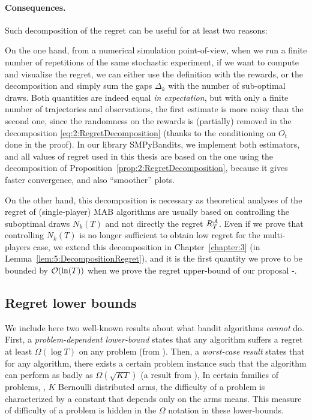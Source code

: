 \paragraph{Consequences.}
%
Such decomposition of the regret can be useful for at least two reasons:

On the one hand, from a numerical simulation point-of-view, when we run a finite number of repetitions of the same stochastic experiment, if we want to compute and visualize the regret, we can either use the definition with the rewards, or the decomposition and simply sum the gaps $\Delta_k$ with the number of sub-optimal draws.
Both quantities are indeed equal \emph{in expectation}, but with only a finite number of trajectories and observations, the first estimate is more noisy than the second one, since the randomness on the rewards is (partially) removed in the decomposition \eqref{eq:2:RegretDecomposition} (thanks to the conditioning on $O_t$ done in the proof).
In our library SMPyBandits, we implement both estimators, and all values of regret used in this thesis are based on the one using the decomposition of Proposition~\ref{prop:2:RegretDecomposition}, because it gives faster convergence, and also ``smoother'' plots.
\label{remark:2:moreAccurateCountofRegretForSimulations}

On the other hand, this decomposition is necessary as theoretical analyses of the regret of (single-player) MAB algorithms are usually based on controlling the suboptimal draws $N_k(T)$ and not directly the regret $R_T^{\mathcal{A}}$.
Even if we prove that controlling $N_k(T)$ is no longer sufficient to obtain low regret for the multi-players case, we extend this decomposition in Chapter~\ref{chapter:3} (in Lemma~\ref{lem:5:DecompositionRegret}), and it is the first quantity we prove to be bounded by $\mathop{}\mathopen{}\mathcal{O}\mathopen{}\left(\ln(T)\right)$ when we prove the regret upper-bound of our proposal \MCTopM-\klUCB.


\subsection{Regret lower bounds}

We include here two well-known results about what bandit algorithms \emph{cannot} do.
First, a \emph{problem-dependent lower-bound} states that any algorithm suffers a regret at least $\Omega(\log T)$ on any problem (from \cite{LaiRobbins85}).
Then, a \emph{worst-case result} states that for any algorithm, there exists a certain problem instance such that the algorithm can perform as badly as $\Omega(\sqrt{K T})$ (a result from \cite{Auer02NonStochastic}),
%
In certain families of problems, \eg, $K$ Bernoulli distributed arms, the difficulty of a problem is characterized by a constant that depends only on the arms means. This measure of difficulty of a problem is hidden in the $\Omega$ notation in these lower-bounds.

